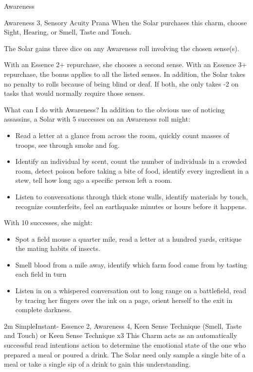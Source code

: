 \begin{Ability}{Awareness}

  {Awareness 3, Sensory Acuity Prana}
  When the Solar purchases this charm, choose Sight, Hearing, or Smell, Taste and Touch.

  The Solar gains three dice on any Awareness roll involving the chosen sense(s).

  With an Essence 2+ repurchase, she chooses a second sense.
  With an Essence 3+ repurchase, the bonus applies to all the listed senses. In addition, the Solar takes no penalty to rolls because of being blind or deaf. If both, she only takes -2 on tasks that would normally require those senses.

\begin{sidebar}{What can I do with Awareness?}
  In addition to the obvious use of noticing assassins, a Solar with 5 successes on an Awareness roll might:

  \begin{itemize}
    \item Read a letter at a glance from across the room, quickly count masses of troops, see through smoke and fog.
    \item Identify an individual by scent, count the number of individuals in a crowded room, detect poison before taking a bite of food, identify every ingredient in a stew, tell how long ago a specific person left a room.
    \item Listen to conversations through thick stone walls, identify materials by touch, recognize counterfeits, feel an earthquake minutes or hours before it happens.
  \end{itemize}

  With 10 successes, she might:
  \begin{itemize}
    \item Spot a field mouse a quarter mile, read a letter at a hundred yards, critique the mating habits of insects.
    \item Smell blood from a mile away, identify which farm food came from by tasting each field in turn
    \item Listen in on a whispered conversation out to long range on a battlefield, read by tracing her fingers over the ink on a page, orient herself to the exit in complete darkness.
  \end{itemize}
\end{sidebar}

  {2m}
  {Simple}{Instant}{-}
  {Essence 2, Awareness 4, Keen Sense Technique (Smell, Taste and Touch) or Keen Sense Technique x3}
  This Charm acts as an automatically successful read intentions action to determine the emotional state of the one who prepared a meal or poured a drink. The Solar need only sample a single bite of a meal or take a single sip of a drink to gain this understanding.


\end{Ability}
